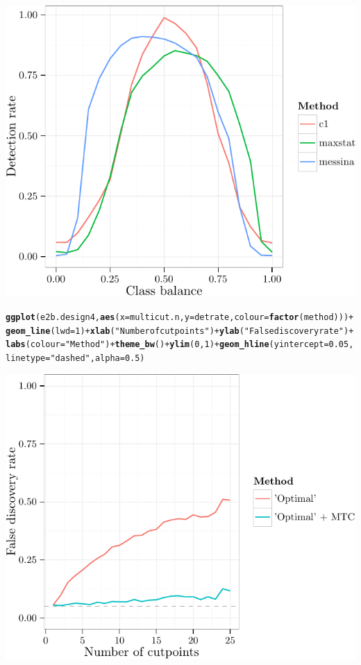 \documentclass{article}\usepackage[]{graphicx}\usepackage[]{color}
\makeatletter
\def\maxwidth{ %
  \ifdim\Gin@nat@width>\linewidth
    \linewidth
  \else
    \Gin@nat@width
  \fi
}
\newcommand{\hlnum}[1]{\textcolor[rgb]{0.686,0.059,0.569}{#1}}%
\newcommand{\hlstr}[1]{\textcolor[rgb]{0.192,0.494,0.8}{#1}}%
\newcommand{\hlopt}[1]{\textcolor[rgb]{0,0,0}{#1}}%
\newcommand{\hlstd}[1]{\textcolor[rgb]{0.345,0.345,0.345}{#1}}%
\newcommand{\hlkwc}[1]{\textcolor[rgb]{0.333,0.667,0.333}{#1}}%
\newcommand{\hlkwd}[1]{\textcolor[rgb]{0.737,0.353,0.396}{\textbf{#1}}}%
\newenvironment{kframe}{%
 \def\at@end@of@kframe{}%
 \ifinner\ifhmode%
  \def\at@end@of@kframe{\end{minipage}}%
  \begin{minipage}{\columnwidth}%
 \fi\fi%
 \def\FrameCommand##1{\hskip\@totalleftmargin \hskip-\fboxsep
 \colorbox{shadecolor}{##1}\hskip-\fboxsep
     \hskip-\linewidth \hskip-\@totalleftmargin \hskip\columnwidth}%
 \MakeFramed {\advance\hsize-\width
   \@totalleftmargin\z@ \linewidth\hsize
   \@setminipage}}%
 {\par\unskip\endMakeFramed%
 \at@end@of@kframe}
\newenvironment{knitrout}{}{} %
\makeatother
\begin{document}
\begin{knitrout}
{\centering \includegraphics[width=\maxwidth]{figure/06-E2B-E2B-plots-7} 

}


\begin{kframe}\begin{alltt}
\hlkwd{ggplot}\hlstd{(e2b.design4,} \hlkwd{aes}\hlstd{(}\hlkwc{x} \hlstd{= multicut.n,} \hlkwc{y} \hlstd{= detrate,} \hlkwc{colour} \hlstd{=} \hlkwd{factor}\hlstd{(method)))} \hlopt{+} \hlkwd{geom_line}\hlstd{(}\hlkwc{lwd} \hlstd{=} \hlnum{1}\hlstd{)} \hlopt{+} \hlkwd{xlab}\hlstd{(}\hlstr{"Number of cutpoints"}\hlstd{)} \hlopt{+} \hlkwd{ylab}\hlstd{(}\hlstr{"False discovery rate"}\hlstd{)} \hlopt{+} \hlkwd{labs}\hlstd{(}\hlkwc{colour} \hlstd{=} \hlstr{"Method"}\hlstd{)} \hlopt{+} \hlkwd{theme_bw}\hlstd{()} \hlopt{+} \hlkwd{ylim}\hlstd{(}\hlnum{0}\hlstd{,} \hlnum{1}\hlstd{)} \hlopt{+} \hlkwd{geom_hline}\hlstd{(}\hlkwc{yintercept} \hlstd{=} \hlnum{0.05}\hlstd{,} \hlkwc{linetype} \hlstd{=} \hlstr{"dashed"}\hlstd{,} \hlkwc{alpha} \hlstd{=} \hlnum{0.5}\hlstd{)}
\end{alltt}
\end{kframe}

{\centering \includegraphics[width=\maxwidth]{figure/06-E2B-E2B-plots-8} 

}



\end{knitrout}
\end{document}
